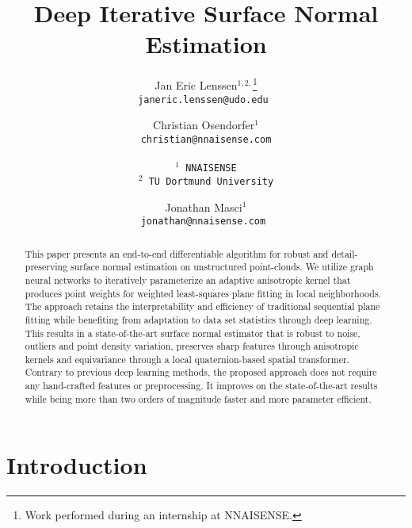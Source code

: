 \documentclass[10pt,twocolumn,letterpaper]{article}
\begin{document}
\title{Deep Iterative Surface Normal Estimation}

\author{Jan Eric Lenssen$^{1,2,}$\thanks{Work performed during an internship at NNAISENSE.} \\
\tt\small janeric.lenssen@udo.edu
\and
Christian Osendorfer$^{1}$\\
\tt\small christian@nnaisense.com
\\
\\
$^{1}$ NNAISENSE \\
$^{2}$ TU Dortmund University\\
\and
Jonathan Masci$^{1}$\\
\tt\small jonathan@nnaisense.com
}

\maketitle
\thispagestyle{empty}
\vspace{-1cm}

\begin{abstract}
This paper presents an end-to-end differentiable algorithm for robust and detail-preserving surface normal estimation on unstructured point-clouds. We utilize graph neural networks to iteratively parameterize an adaptive anisotropic kernel that produces point weights for weighted least-squares plane fitting in local neighborhoods.
The approach retains the interpretability and efficiency of traditional sequential
plane fitting while benefiting from adaptation to data set statistics through deep learning.
This results in a state-of-the-art surface normal estimator that is robust to
noise, outliers and point density variation, preserves sharp features
through anisotropic kernels and equivariance through a local quaternion-based spatial transformer. Contrary to
previous deep learning methods, the proposed approach does not require any 
hand-crafted features or preprocessing. It improves on the state-of-the-art results while being more than two orders of magnitude faster and more parameter efficient. 
\end{abstract}
\vspace{-0.3cm}
\section{Introduction}
\end{document}
